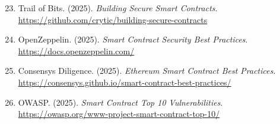 \documentclass[11pt,a4paper]{article}
\begin{document}
\begin{enumerate}
    \setcounter{enumi}{22}

    \item Trail of Bits. (2025). \textit{Building Secure Smart Contracts}. \url{https://github.com/crytic/building-secure-contracts}

    \item OpenZeppelin. (2025). \textit{Smart Contract Security Best Practices}. \url{https://docs.openzeppelin.com/}

    \item Consensys Diligence. (2025). \textit{Ethereum Smart Contract Best Practices}. \url{https://consensys.github.io/smart-contract-best-practices/}

    \item OWASP. (2025). \textit{Smart Contract Top 10 Vulnerabilities}. \url{https://owasp.org/www-project-smart-contract-top-10/}
\end{enumerate}
\end{document}
